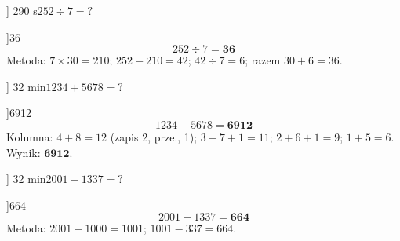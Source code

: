 \ExerciseSlide[\CategoryBadge[ArithColor!20]{Dzielenie}]
  {2}{90 s}{$252 \div 7 = ?$}

\AnswerSlide[\CategoryBadge[ArithColor!20]{Dzielenie}]{36}{
  {\footnotesize
    \[ 252 \div 7 = \mathbf{36} \]
    Metoda: $7 \times 30 = 210$; $252 - 210 = 42$;
    $42 \div 7 = 6$; razem $30 + 6 = 36$.
  }
}

\ExerciseSlide[\CategoryBadge[ArithColor!20]{Dodawanie}]
  {3}{2 min}{$1234 + 5678 = ?$}

\AnswerSlide[\CategoryBadge[ArithColor!20]{Dodawanie}]{6912}{
  {\footnotesize
    \[ 1234 + 5678 = \mathbf{6912} \]
    Kolumna: $4{+}8{=}12$ (zapis 2, prze., 1); $3{+}7{+}1{=}11$;
    $2{+}6{+}1{=}9$; $1{+}5{=}6$. Wynik: $\mathbf{6912}$.
  }
}

\ExerciseSlide[\CategoryBadge[ArithColor!20]{Odejmowanie}]
  {3}{2 min}{$2001 - 1337 = ?$}

\AnswerSlide[\CategoryBadge[ArithColor!20]{Odejmowanie}]{664}{
  {\footnotesize
    \[ 2001 - 1337 = \mathbf{664} \]
    Metoda: $2001 - 1000 = 1001$;
    $1001 - 337 = 664$.
  }
}
